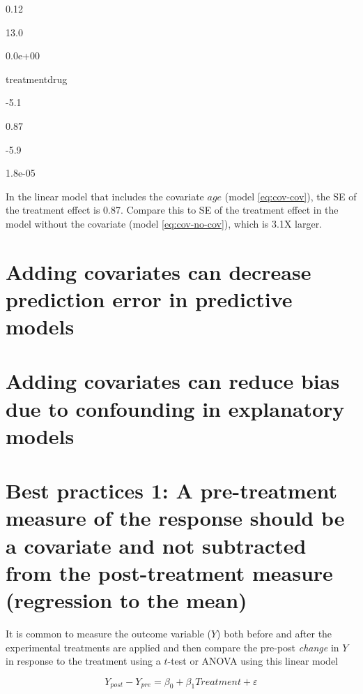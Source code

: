 \documentclass[]{book}
\begin{document}
0.12

13.0

0.0e+00

treatmentdrug

-5.1

0.87

-5.9

1.8e-05

In the linear model that includes the covariate \(age\) (model \eqref{eq:cov-cov}), the SE of the treatment effect is 0.87. Compare this to SE of the treatment effect in the model without the covariate (model \eqref{eq:cov-no-cov}), which is 3.1X larger.

\hypertarget{adding-covariates-can-decrease-prediction-error-in-predictive-models}{%
\section{Adding covariates can decrease prediction error in predictive models}\label{adding-covariates-can-decrease-prediction-error-in-predictive-models}}

\hypertarget{adding-covariates-can-reduce-bias-due-to-confounding-in-explanatory-models}{%
\section{Adding covariates can reduce bias due to confounding in explanatory models}\label{adding-covariates-can-reduce-bias-due-to-confounding-in-explanatory-models}}

\hypertarget{best-practices-1-a-pre-treatment-measure-of-the-response-should-be-a-covariate-and-not-subtracted-from-the-post-treatment-measure-regression-to-the-mean}{%
\section{Best practices 1: A pre-treatment measure of the response should be a covariate and not subtracted from the post-treatment measure (regression to the mean)}\label{best-practices-1-a-pre-treatment-measure-of-the-response-should-be-a-covariate-and-not-subtracted-from-the-post-treatment-measure-regression-to-the-mean}}

It is common to measure the outcome variable (\(Y\)) both before and after the experimental treatments are applied and then compare the pre-post \emph{change} in \(Y\) in response to the treatment using a \(t\)-test or ANOVA using this linear model

\begin{equation}
Y_{post}-Y_{pre} = \beta_0 + \beta_1 Treatment + \varepsilon
\label{eq:cov-change-score}
\end{equation}
\end{document}
